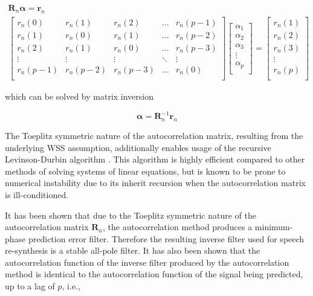 \begin{eqnarray}
	\boldsymbol{R}_n \boldsymbol{\alpha} = \boldsymbol{r}_n \\
   	\begin{bmatrix} 
	   	r_n(0)    & r_n(1)      & r_n(2)     & \dots     & r_n(p-1)  \\
	   	r_n(1)     & r_n(0)      & r_n(1)     & \dots     & r_n(p-2)  \\
	   	r_n(2)     & r_n(1)      & r_n(0)     & \dots     & r_n(p-3)  \\
	   	\vdots     & \vdots      & \vdots     & \ddots  & \vdots  \\
	   	r_n(p-1)  & r_n(p-2)  & r_n(p-3) & \dots    & r_n(0)  \\
	\end{bmatrix} 
	\begin{bmatrix}
		\alpha_1 \\
		\alpha_2 \\
		\alpha_3 \\
		\vdots    \\
		\alpha_p \\
	\end{bmatrix}
	=
	\begin{bmatrix}
		r_n(1)  \\
		r_n(2) \\
		r_n(3) \\
		\vdots    \\
		r_n(p) \\
\end{bmatrix}
\end{eqnarray}

\noindent
which can be solved by matrix inversion

\begin{equation}
	 \boldsymbol{\alpha} = \boldsymbol{R}_n^{-1} \boldsymbol{r}_n
\end{equation}

The Toeplitz symmetric nature of the autocorrelation matrix, resulting from the underlying WSS assumption, additionally enables usage of the recursive Levinson-Durbin algorithm \citep{durbin1960fitting}. This algorithm is highly efficient compared to other methods of solving systems of linear equations, but is known to be prone to numerical instability due to its inherit recursion when the autocorrelation matrix is ill-conditioned.

It has been shown that due to the Toeplitz symmetric nature of the autocorrelation matrix $\boldsymbol{R}_n$, the autocorrelation method produces a minimum-phase prediction error filter. Therefore the resulting inverse filter used for speech re-synthesis is a stable all-pole filter. It has also been shown that the autocorrelation function of the inverse filter produced by the autocorrelation method is identical to the autocorrelation function of the signal being predicted, up to a lag of $p$, i.e.,

